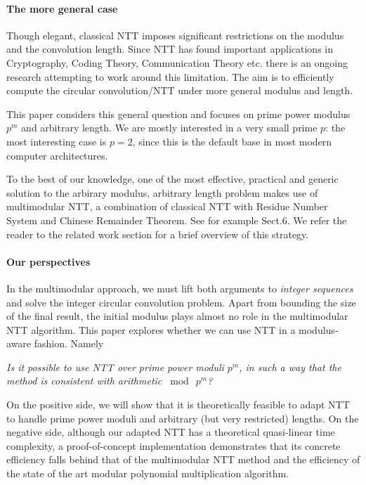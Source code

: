 \paragraph{The more general case}
Though elegant, classical NTT imposes significant restrictions on the modulus and the convolution length. Since NTT has found important applications in Cryptography, Coding Theory, Communication Theory etc. there is an ongoing research attempting to work around this limitation. The aim is to efficiently compute the circular convolution/NTT under more general modulus and length.

This paper considers this general question and focuses on prime power modulus \(p^m\) and arbitrary length. We are mostly interested in a very small prime \(p\): the most interesting case is \(p = 2\), since this is the default base in most modern computer architectures.

To the best of our knowledge, one of the most effective, practical and generic solution to the arbirary modulus, arbitrary length problem makes use of multimodular NTT, a combination of classical NTT with Residue Number System and Chinese Remainder Theorem. See for example \cite{JSC:Shoup95} Sect.6. We refer the reader to the related work section for a brief overview of this strategy.

\paragraph{Our perspectives}
In the multimodular approach, we must lift both arguments to \emph{integer sequences} and solve the integer circular convolution problem. Apart from bounding the size of the final result, the initial modulus plays almost no role in the multimodular NTT algorithm. This paper explores whether we can use NTT in a modulus-aware fashion. Namely

\begin{center}
    \it
    Is it possible to use NTT over prime power moduli \(p^m\), in such a way that the method is consistent with arithmetic \(\bmod \  p^m\)?
\end{center}

On the positive side, we will show that it is theoretically feasible to adapt NTT to handle prime power moduli and arbitrary (but very restricted) lengths. On the negative side, although our adapted NTT has a theoretical quasi-linear time complexity, a proof-of-concept implementation demonstrates that its concrete efficiency falls behind that of the multimodular NTT method and the efficiency of the state of the art modular polynomial multiplication algorithm. 

